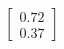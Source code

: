 \documentclass[preview]{standalone}
\begin{document}
\begin{align*}
\begin{bmatrix} 0.72 \\ 0.37 \end{bmatrix}
\end{align*}
\end{document}
